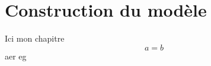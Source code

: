 \documentclass[main.tex]{subfiles}
\begin{document}
\chapter{Construction du modèle}
Ici mon chapitre
\begin{equation}
\label{eq:test}
a=b
\end{equation}
aer eg \cite{Andersson2006}
\end{document}
